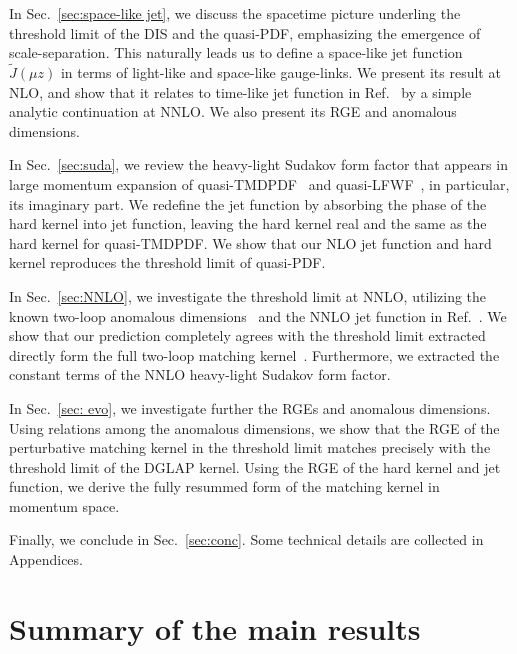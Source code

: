 \documentclass[a4paper,11pt]{article}
\begin{document}
In Sec.~\ref{sec:space-like jet}, we discuss the spacetime picture underling the threshold limit of the DIS and the quasi-PDF, emphasizing the emergence of scale-separation. This naturally leads us to define a space-like jet function $\tilde J(\mu z)$ in terms of light-like and space-like gauge-links. We present its result at NLO, and show that it relates to time-like jet function in Ref.~\cite{Jain:2008gb} by a simple analytic continuation at NNLO.  We also present its RGE and anomalous dimensions. 

In Sec.~\ref{sec:suda}, we review the heavy-light Sudakov form factor that appears in large momentum expansion of quasi-TMDPDF~\cite{Ji:2014hxa,Ebert:2019okf,Ji:2019ewn,Vladimirov:2020ofp,Ebert:2020gxr,Ebert:2022fmh} and quasi-LFWF~\cite{Ji:2021znw}, in particular, its imaginary part. We redefine the jet function by absorbing the phase of the hard kernel into jet function, leaving the hard kernel real and the same as the hard kernel for quasi-TMDPDF. We show that our NLO jet function and hard kernel reproduces the threshold limit of quasi-PDF. 

In Sec.~\ref{sec:NNLO}, we investigate the threshold limit at NNLO, utilizing the known two-loop anomalous dimensions~\cite{Ji:2019ewn,Ji:2021znw,LPC:2022zci} and the NNLO jet function in Ref.~\cite{Jain:2008gb}. We show that our prediction completely agrees with the threshold limit extracted directly form the full two-loop matching kernel~\cite{Li:2020xml,Chen:2020ody}. Furthermore, we extracted the constant terms of the NNLO heavy-light Sudakov form factor. 

In Sec.~\ref{sec: evo}, we investigate further the RGEs and anomalous dimensions. Using relations among the anomalous dimensions, we show that the RGE of the perturbative matching kernel in the threshold limit matches precisely with the threshold limit of the DGLAP kernel. Using the RGE of the hard kernel and jet function, we derive the fully resummed form of the matching kernel in momentum space. 

Finally, we conclude in Sec.~\ref{sec:conc}. Some technical details are collected in Appendices.

\section{Summary of the main results}\label{sec:summary}
\end{document}
